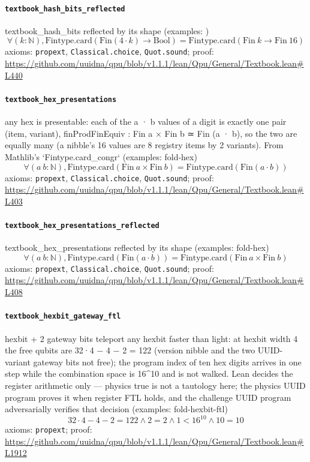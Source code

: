 \documentclass[11pt]{article}
\begin{document}
\paragraph{\texttt{textbook\_hash\_bits\_reflected}}
textbook\_hash\_bits reflected by its shape (examples: )
\[ \forall (k : \mathbb{N}), \mathrm{Fintype.card} (\mathrm{Fin} (4 \cdot k) \to \mathrm{Bool}) = \mathrm{Fintype.card} (\mathrm{Fin}\ k \to \mathrm{Fin}\ 16) \]
\noindent axioms: \texttt{propext}, \texttt{Classical.choice}, \texttt{Quot.sound}; proof: \url{https://github.com/uuidna/qpu/blob/v1.1.1/lean/Qpu/General/Textbook.lean\#L440}

\paragraph{\texttt{textbook\_hex\_presentations}}
any hex is presentable: each of the a · b values of a digit is exactly one pair (item, variant), finProdFinEquiv : Fin a × Fin b ≃ Fin (a · b), so the two are equally many (a nibble's 16 values are 8 registry items by 2 variants). From Mathlib's `Fintype.card\_congr` (examples: fold-hex)
\[ \forall (a\ b : \mathbb{N}), \mathrm{Fintype.card} (\mathrm{Fin}\ a \times \mathrm{Fin}\ b) = \mathrm{Fintype.card} (\mathrm{Fin} (a \cdot b)) \]
\noindent axioms: \texttt{propext}, \texttt{Classical.choice}, \texttt{Quot.sound}; proof: \url{https://github.com/uuidna/qpu/blob/v1.1.1/lean/Qpu/General/Textbook.lean\#L403}

\paragraph{\texttt{textbook\_hex\_presentations\_reflected}}
textbook\_hex\_presentations reflected by its shape (examples: fold-hex)
\[ \forall (a\ b : \mathbb{N}), \mathrm{Fintype.card} (\mathrm{Fin} (a \cdot b)) = \mathrm{Fintype.card} (\mathrm{Fin}\ a \times \mathrm{Fin}\ b) \]
\noindent axioms: \texttt{propext}, \texttt{Classical.choice}, \texttt{Quot.sound}; proof: \url{https://github.com/uuidna/qpu/blob/v1.1.1/lean/Qpu/General/Textbook.lean\#L408}

\paragraph{\texttt{textbook\_hexbit\_gateway\_ftl}}
hexbit + 2 gateway bits teleport any hexbit faster than light: at hexbit width 4 the free qubits are 32·4 − 4 − 2 = 122 (version nibble and the two UUID-variant gateway bits not free); the program index of ten hex digits arrives in one step while the combination space is 16\^{}10 and is not walked. Lean decides the register arithmetic only — physics true is not a tautology here; the physics UUID program proves it when register FTL holds, and the challenge UUID program adversarially verifies that decision (examples: fold-hexbit-ftl)
\[ 32 \cdot 4 - 4 - 2 = 122 \land 2 = 2 \land 1 < 16 ^{10} \land 10 = 10 \]
\noindent axioms: \texttt{propext}; proof: \url{https://github.com/uuidna/qpu/blob/v1.1.1/lean/Qpu/General/Textbook.lean\#L1912}
\end{document}
